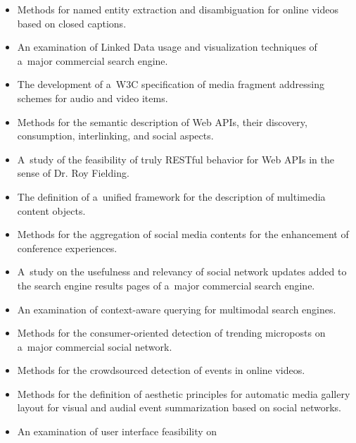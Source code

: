\begin{itemize}
  \item Methods for named entity extraction and disambiguation
        for online videos based on closed captions.
  \item An examination of Linked Data usage and visualization
        techniques of a~major commercial search engine.
  \item The development of a~W3C specification of media
        fragment addressing schemes for audio and video items.
  \item Methods for the semantic description of Web APIs,
        their discovery, consumption, interlinking,
        and social aspects.
  \item A~study of the feasibility of truly RESTful behavior
        for Web APIs in the sense of Dr. Roy Fielding.
  \item The definition of a~unified framework for the description
        of multimedia content objects.
  \item Methods for the aggregation of social media contents
        for the enhancement of conference experiences.
  \item A~study on the usefulness and relevancy of social network
        updates added to the search engine results pages of a~major
        commercial search engine.
  \item An examination of context-aware querying for multimodal
        search engines.
  \item Methods for the consumer-oriented detection of trending
        microposts on a~major commercial social network.
  \item Methods for the crowdsourced detection of events in
        online videos.
  \item Methods for the definition of aesthetic principles
        for automatic media gallery layout for visual
        and audial event summarization based on social networks.
  \item An examination of user interface feasibility on

\end{itemize}
